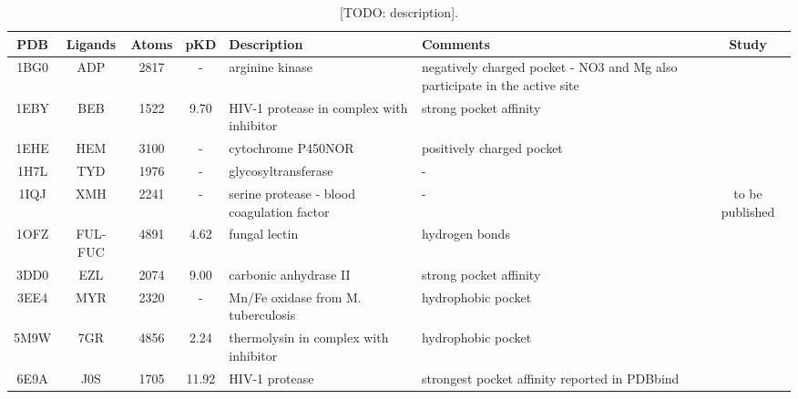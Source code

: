   \begin{table}[H]
    \caption{\label{tab:methods/benchmark_prot} [TODO: description].}
    \centering
    \begin{tabular}{ccccp{1.5in}p{1.5in}c}
      \hline
      PDB  & Ligands & Atoms & pKD   & Description                                & Comments                                                                   & Study                            \\ \hline
      1BG0 & ADP     & 2817  & -     & arginine kinase                            & negatively charged pocket - NO3 and Mg also participate in the active site & \cite{benchmark_negative_2000}    \\ \hline
      1EBY & BEB     & 1522  & 9.70  & HIV-1 protease in complex with inhibitor   & strong pocket affinity                                                     & \cite{benchmark_strong_2021}      \\ \hline
      1EHE & HEM     & 3100  & -     & cytochrome P450NOR                         & positively charged pocket                                                  & \cite{benchmark_positive_2001}    \\ \hline
      1H7L & TYD     & 1976  & -     & glycosyltransferase                        & -                                                                          & \cite{benchmark_1h7l_2001}        \\ \hline
      1IQJ & XMH     & 2241  & -     & serine protease - blood coagulation factor & -                                                                          & to be published                   \\ \hline
      1OFZ & FUL-FUC & 4891  & 4.62  & fungal lectin                              & hydrogen bonds                                                             & \cite{hbonds_2023}                \\ \hline
      3DD0 & EZL     & 2074  & 9.00  & carbonic anhydrase II                      & strong pocket affinity                                                     & \cite{benchmark_strong_2021}      \\ \hline
      3EE4 & MYR     & 2320  & -     & Mn/Fe oxidase from M. tuberculosis         & hydrophobic pocket                                                         & \cite{benchmark_hydrophobic_2009} \\ \hline
      5M9W & 7GR     & 4856  & 2.24  & thermolysin in complex with inhibitor      & hydrophobic pocket                                                         & \cite{hydrophobic_2017}           \\ \hline
      6E9A & J0S     & 1705  & 11.92 & HIV-1 protease                             & strongest pocket affinity reported in PDBbind                              & \cite{pdbbind_2004}               \\ \hline
    \end{tabular}
  \end{table}

